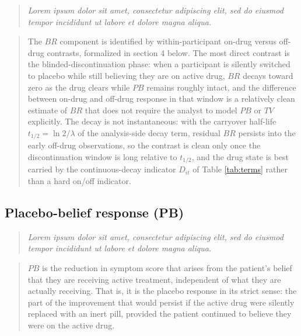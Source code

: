 \documentclass[
  11pt,
]{article}
\newenvironment{rgt}{%
  \begin{quote}\small\itshape\color[RGB]{20,60,160}}{%
  \end{quote}}
\newenvironment{orig}{%
  \begin{quote}\normalsize\color[gray]{0.55}}{%
  \end{quote}}
\begin{document}
\begin{rgt}
Lorem ipsum dolor sit amet, consectetur adipiscing elit, sed do eiusmod tempor incididunt ut labore et dolore magna aliqua.

\end{rgt}

\begin{orig}
The \(BR\) component is identified by within-participant on-drug
versus off-drug contrasts, formalized in section 4 below. The
most direct contrast is the blinded-discontinuation phase: when
a participant is silently switched to placebo while still
believing they are on active drug, \(BR\) decays toward zero as the
drug clears while \(PB\) remains roughly intact, and the difference
between on-drug and off-drug response in that window is a
relatively clean estimate of \(BR\) that does not require the
analyst to model \(PB\) or \(TV\) explicitly. The decay is not
instantaneous: with the carryover half-life
\(t_{1/2} = \ln 2 / \lambda\) of the analysis-side decay term,
residual \(BR\) persists into the early off-drug observations, so
the contrast is clean only once the discontinuation window is
long relative to \(t_{1/2}\), and the drug state is best carried by
the continuous-decay indicator \(D_{it}\) of Table
\ref{tab:terms} rather than a hard on/off indicator.

\end{orig}

\subsection{Placebo-belief response (PB)}\label{placebo-belief-response-pb}

\begin{rgt}
Lorem ipsum dolor sit amet, consectetur adipiscing elit, sed do eiusmod tempor incididunt ut labore et dolore magna aliqua.

\end{rgt}

\begin{orig}
\(PB\) is the reduction in symptom score that arises from the
patient's belief that they are receiving active treatment,
independent of what they are actually receiving. That is, it is
the placebo response in its strict sense: the part of the
improvement that would persist if the active drug were silently
replaced with an inert pill, provided the patient continued to
believe they were on the active drug.

\end{orig}
\end{document}
